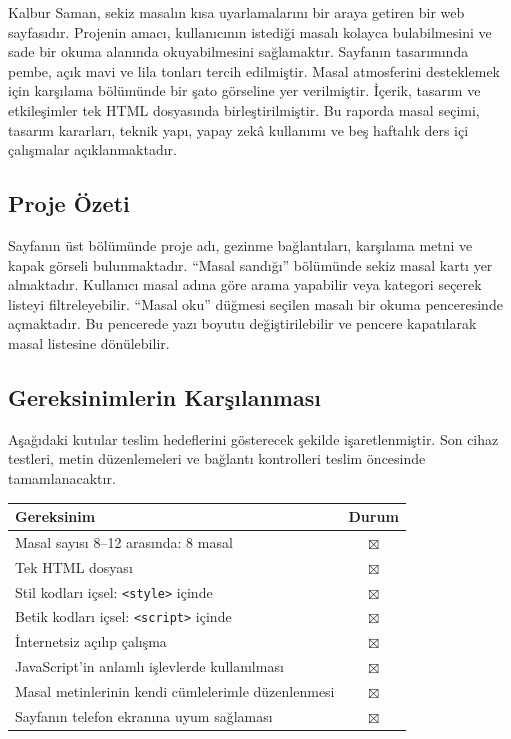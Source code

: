 \documentclass[12pt,a4paper]{article}
\newcommand{\tik}{$\boxtimes$}
\begin{document}
Kalbur Saman, sekiz masalın kısa uyarlamalarını bir araya
getiren bir web sayfasıdır. Projenin amacı, kullanıcının
istediği masalı kolayca bulabilmesini ve sade bir okuma
alanında okuyabilmesini sağlamaktır. Sayfanın tasarımında
pembe, açık mavi ve lila tonları tercih edilmiştir.
Masal atmosferini desteklemek için karşılama bölümünde
bir şato görseline yer verilmiştir. İçerik, tasarım ve
etkileşimler tek HTML dosyasında birleştirilmiştir.
Bu raporda masal seçimi, tasarım kararları, teknik yapı,
yapay zekâ kullanımı ve beş haftalık ders içi çalışmalar
açıklanmaktadır.

\subsection{Proje Özeti}

Sayfanın üst bölümünde proje adı, gezinme bağlantıları,
karşılama metni ve kapak görseli bulunmaktadır.
``Masal sandığı'' bölümünde sekiz masal kartı yer almaktadır.
Kullanıcı masal adına göre arama yapabilir veya kategori
seçerek listeyi filtreleyebilir. ``Masal oku'' düğmesi
seçilen masalı bir okuma penceresinde açmaktadır.
Bu pencerede yazı boyutu değiştirilebilir ve pencere
kapatılarak masal listesine dönülebilir.

\subsection{Gereksinimlerin Karşılanması}

Aşağıdaki kutular teslim hedeflerini gösterecek şekilde
işaretlenmiştir. Son cihaz testleri, metin düzenlemeleri
ve bağlantı kontrolleri teslim öncesinde tamamlanacaktır.

\begin{center}
\begin{tabular}{@{}p{10.7cm}c@{}}
\toprule
\textbf{Gereksinim} & \textbf{Durum}\\
\midrule
Masal sayısı 8--12 arasında: 8 masal & \tik\\
Tek HTML dosyası & \tik\\
Stil kodları içsel: \texttt{<style>} içinde & \tik\\
Betik kodları içsel: \texttt{<script>} içinde & \tik\\
İnternetsiz açılıp çalışma & \tik\\
JavaScript'in anlamlı işlevlerde kullanılması & \tik\\
Masal metinlerinin kendi cümlelerimle düzenlenmesi & \tik\\
Sayfanın telefon ekranına uyum sağlaması & \tik\\
\bottomrule
\end{tabular}
\end{center}
\end{document}

